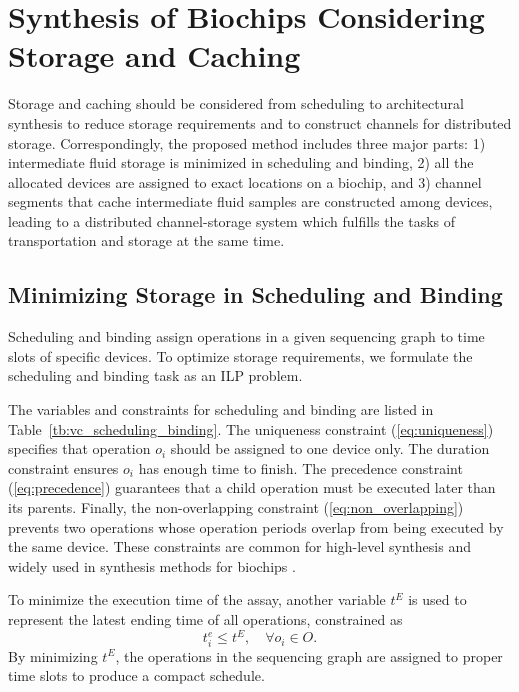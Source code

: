 
\section{Synthesis of Biochips Considering Storage and Caching}
\label{sec:storage_synthesis}

Storage and caching should be considered from scheduling to architectural synthesis
to reduce storage requirements and to construct channels for distributed
storage.
Correspondingly, the proposed method includes three major parts:
1) intermediate fluid storage is minimized in scheduling and binding,
2) all the allocated devices are assigned to exact locations on a biochip, and 3) channel segments that cache intermediate fluid samples are constructed among devices, leading to a
distributed channel-storage system which fulfills the tasks of transportation and storage at the same time.

\subsection{Minimizing Storage in Scheduling and Binding}
\label{sec:scheduling_binding}

Scheduling and binding assign operations in a given sequencing graph
to time slots of specific devices.
To optimize storage requirements,
we formulate the scheduling and binding task as
an ILP problem. %

The variables and constraints for scheduling and binding are listed in
Table~\ref{tb:vc_scheduling_binding}. The uniqueness constraint (\ref{eq:uniqueness})
specifies that operation $o_i$ should be assigned
to one device only. The duration constraint ensures
$o_i$ has enough time to finish.
The precedence constraint (\ref{eq:precedence}) guarantees that a child
operation must be executed later than its parents. Finally, the
non-overlapping constraint (\ref{eq:non_overlapping}) prevents two operations
whose operation periods overlap from being executed by the same device.
These constraints are common for high-level synthesis and
widely used in synthesis methods for biochips \cite{SuCh04}.

To minimize the execution time of the assay, another variable $t^E$ is
used to represent
the latest ending time of all operations, constrained as
\begin{equation}\label{eq:latest_finishing}
t^e_i \le t^E,  \quad \forall o_i\in O.
\end{equation}
\vskip 7pt
By minimizing $t^E$, the operations in the sequencing graph
are assigned to proper time slots %
to produce a compact schedule.

